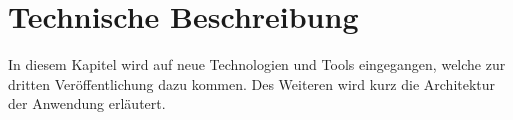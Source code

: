 \chapter{Technische Beschreibung}
In diesem Kapitel wird auf neue Technologien und Tools eingegangen, welche zur dritten Veröffentlichung dazu kommen. Des Weiteren wird kurz die Architektur der Anwendung erläutert.


